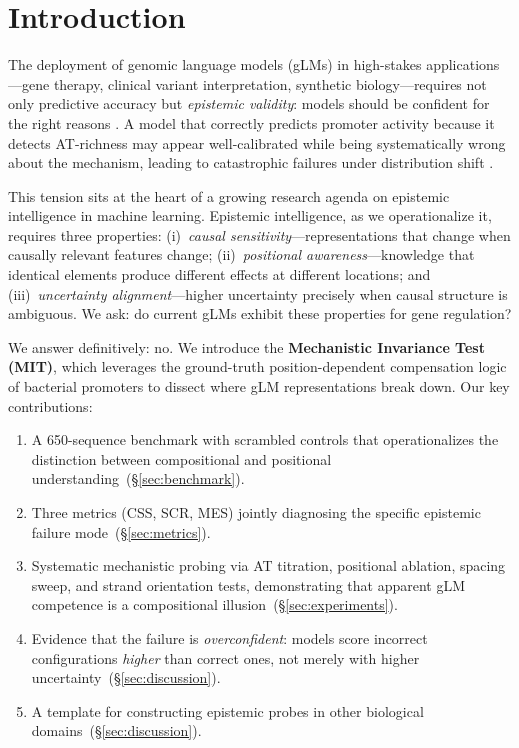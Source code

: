 \documentclass{article}
\begin{document}
\section{Introduction}

The deployment of genomic language models (gLMs) in high-stakes
applications---gene therapy, clinical variant interpretation, synthetic
biology---requires not only predictive accuracy but \emph{epistemic
validity}: models should be confident for the right reasons
\citep{gal2016uncertainty}.
A model that correctly predicts promoter activity because it detects
AT-richness may appear well-calibrated while being systematically wrong
about the mechanism, leading to catastrophic failures under
distribution shift \citep{d2020underspecification}.

This tension sits at the heart of a growing research agenda on epistemic
intelligence in machine learning.
Epistemic intelligence, as we operationalize it, requires three
properties: (i)~\emph{causal sensitivity}---representations that change when
causally relevant features change; (ii)~\emph{positional
awareness}---knowledge that identical elements produce different effects at
different locations; and (iii)~\emph{uncertainty alignment}---higher
uncertainty precisely when causal structure is ambiguous.
We ask: do current gLMs exhibit these properties for gene regulation?

We answer definitively: no.
We introduce the \textbf{Mechanistic Invariance Test (MIT)}, which
leverages the ground-truth position-dependent compensation logic of
bacterial promoters to dissect where gLM representations break down.
Our key contributions:

\begin{enumerate}
\setlength{\itemsep}{1pt}
\item A 650-sequence benchmark with scrambled controls that operationalizes
      the distinction between compositional and positional
      understanding~(\S\ref{sec:benchmark}).
\item Three metrics (CSS, SCR, MES) jointly diagnosing the specific
      epistemic failure mode~(\S\ref{sec:metrics}).
\item Systematic mechanistic probing via AT titration, positional ablation,
      spacing sweep, and strand orientation tests, demonstrating that
      apparent gLM competence is a compositional illusion~(\S\ref{sec:experiments}).
\item Evidence that the failure is \emph{overconfident}: models score
      incorrect configurations \emph{higher} than correct ones, not merely
      with higher uncertainty~(\S\ref{sec:discussion}).
\item A template for constructing epistemic probes in other biological
      domains~(\S\ref{sec:discussion}).
\end{enumerate}
\end{document}
